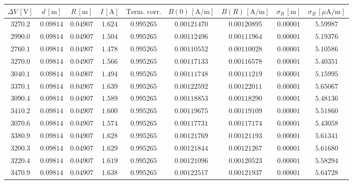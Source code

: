 \documentclass[]{article}
\begin{document}
\begin{table}
    \centering

\begin{tabular}{||c|c|c|c|c|c|c|c|c||}
    \hline
    $\Delta V\, [\text{V}] $ & $d\, [\text{m}] $ & $R\, [\text{m}] $ & $I\, [\text{A}] $ & $\text{Term. corr.}$ & $B(0)\, [\text{A/m}] $ & $B(R)\, [\text{A/m}] $ & $ \sigma_R \, [\text{m}] $ & $ \sigma_B \, [\mu\text{A/m}] $ \\
    \hline\hline



    $3270.2$ & $0.09814$ & $0.04907$ & $1.624$ & $0.995265$ & $0.00121470$ & $0.00120895$ & $0.00001$ & $5.59987$ \\\hline
    $2990.0$ & $0.09814$ & $0.04907$ & $1.504$ & $0.995265$ & $0.00112496$ & $0.00111964$ & $0.00001$ & $5.19376$ \\\hline
    $2760.1$ & $0.09814$ & $0.04907$ & $1.478$ & $0.995265$ & $0.00110552$ & $0.00110028$ & $0.00001$ & $5.10586$ \\\hline
    $3270.0$ & $0.09814$ & $0.04907$ & $1.566$ & $0.995265$ & $0.00117133$ & $0.00116578$ & $0.00001$ & $5.40351$ \\\hline
    $3040.1$ & $0.09814$ & $0.04907$ & $1.494$ & $0.995265$ & $0.00111748$ & $0.00111219$ & $0.00001$ & $5.15995$ \\\hline
    $3370.1$ & $0.09814$ & $0.04907$ & $1.639$ & $0.995265$ & $0.00122592$ & $0.00122011$ & $0.00001$ & $5.65067$ \\\hline
    $3090.4$ & $0.09814$ & $0.04907$ & $1.589$ & $0.995265$ & $0.00118853$ & $0.00118290$ & $0.00001$ & $5.48136$ \\\hline
    $3410.2$ & $0.09814$ & $0.04907$ & $1.600$ & $0.995265$ & $0.00119675$ & $0.00119109$ & $0.00001$ & $5.51860$ \\\hline
    $3070.6$ & $0.09814$ & $0.04907$ & $1.574$ & $0.995265$ & $0.00117731$ & $0.00117174$ & $0.00001$ & $5.43058$ \\\hline
    $3380.9$ & $0.09814$ & $0.04907$ & $1.628$ & $0.995265$ & $0.00121769$ & $0.00121193$ & $0.00001$ & $5.61341$ \\\hline
    $3200.3$ & $0.09814$ & $0.04907$ & $1.629$ & $0.995265$ & $0.00121844$ & $0.00121267$ & $0.00001$ & $5.61680$ \\\hline
    $3220.4$ & $0.09814$ & $0.04907$ & $1.619$ & $0.995265$ & $0.00121096$ & $0.00120523$ & $0.00001$ & $5.58294$ \\\hline
    $3470.9$ & $0.09814$ & $0.04907$ & $1.638$ & $0.995265$ & $0.00122517$ & $0.00121937$ & $0.00001$ & $5.64728$ \\\hline

\end{tabular}
\end{table}
\end{document}
